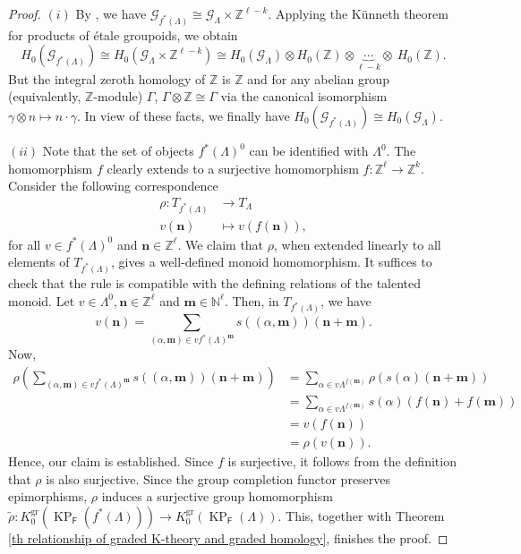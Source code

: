 \documentclass[12pt]{amsart}
\newcommand{\N}{\mathbf{n}}
\newcommand{\M}{\mathbf{m}}
\newcommand{\KP}{\operatorname{KP}}
\theoremstyle{definition}
\theoremstyle{remark}
\newcommand{\gr}{\operatorname{gr}}
\begin{document}
\begin{proof}
$(i)$ By \cite[Proposition 2.10]{Kumjian--Pask}, we have $\mathcal{G}_{f^*(\Lambda)}\cong \mathcal{G}_\Lambda\times \mathbb{Z}^{\ell-k}$. Applying the K\"{u}nneth theorem \cite[Theorem 2.4 \& Corollary 2.5]{MatAdv} for products of \'{e}tale groupoids, we obtain \[H_0(\mathcal{G}_{f^*(\Lambda)})\cong H_0(\mathcal{G}_\Lambda\times \mathbb{Z}^{\ell-k})\cong H_0(\mathcal{G}_\Lambda)\otimes H_0(\mathbb{Z})\otimes \underbrace{\cdots}_{\ell-k} \otimes~ H_0(\mathbb{Z}).\] But the integral zeroth homology of $\mathbb{Z}$ is $\mathbb{Z}$ and for any abelian group (equivalently, $\mathbb{Z}$-module) $\Gamma$, $\Gamma\otimes \mathbb{Z}\cong \Gamma$ via the canonical isomorphism $\gamma\otimes n\longmapsto n\cdot \gamma$. In view of these facts, we finally have $H_0(\mathcal{G}_{f^*(\Lambda)})\cong H_0(\mathcal{G}_\Lambda)$.

$(ii)$ Note that the set of objects $f^*(\Lambda)^0$ can be identified with $\Lambda^0$. The homomorphism $f$ clearly extends to a surjective homomorphism $f:\mathbb{Z}^\ell\longrightarrow \mathbb{Z}^k$. Consider the following correspondence 
\begin{align*}
    \rho:T_{f^*(\Lambda)}&\longrightarrow T_\Lambda\\
    v(\N) &\longmapsto v(f(\N)),
\end{align*}
for all $v\in f^*(\Lambda)^0$ and $\N\in \mathbb{Z}^\ell$. We claim that $\rho$, when extended linearly to all elements of $T_{f^*(\Lambda)}$, gives a well-defined monoid homomorphism. It suffices to check that the rule is compatible with the defining relations of the talented monoid. Let $v\in \Lambda^0,\N\in \mathbb{Z}^\ell$ and $\M\in \mathbb{N}^\ell$. Then, in $T_{f^*(\Lambda)}$, we have \[v(\N)=\displaystyle{\sum_{(\alpha,\M)\in vf^*(\Lambda)^\M}} s((\alpha,\M))(\N+\M).\] Now, 
\begin{align*}
\rho\left(\displaystyle{\sum_{(\alpha,\M)\in vf^*(\Lambda)^\M}}s((\alpha,\M))(\N+\M)\right)&=\displaystyle{\sum_{\alpha\in v\Lambda^{f(\M)}}} \rho\left(s(\alpha)(\N+\M)\right)\\
&=\displaystyle{\sum_{\alpha\in v\Lambda^{f(\M)}}} s(\alpha)(f(\N)+f(\M))\\
&=v(f(\N))\\
&=\rho(v(\N)).    
\end{align*}
Hence, our claim is established. Since $f$ is surjective, it follows from the definition that $\rho$ is also surjective. Since the group completion functor preserves epimorphisms, $\rho$ induces a surjective group homomorphism $\tilde{\rho}:K_0^{\gr}(\KP_\mathsf{F}(f^*(\Lambda)))\longrightarrow K_0^{\gr}(\KP_\mathsf{F}(\Lambda))$. This, together with Theorem \ref{th relationship of graded K-theory and graded homology}, finishes the proof.
\end{proof}
\end{document}
